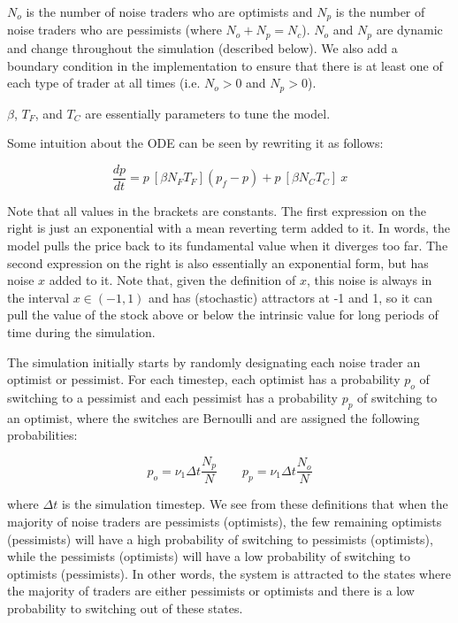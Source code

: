 \documentclass[11pt]{article}
\begin{document}
\noindent $N_o$ is the number of noise traders who are optimists and $N_p$ is the number of noise traders who are pessimists (where $N_o + N_p = N_c$). $N_o$ and $N_p$ are dynamic and change throughout the simulation (described below). We also add a boundary condition in the implementation to ensure that there is at least one of each type of trader at all times (i.e. $N_o > 0$ and $N_p > 0$).



\noindent $\beta$, $T_F$, and $T_C$ are essentially parameters to tune the model.

Some intuition about the ODE can be seen by rewriting it as follows:

\begin{equation}
\frac{dp}{dt} = p \ [\beta N_F T_F] (p_f - p) + p \ [\beta N_C T_C] \ x
\end{equation}

\noindent Note that all values in the brackets are constants. The first expression on the right is just an exponential with a mean reverting term added to it. In words, the model pulls the price back to its fundamental value when it diverges too far. The second expression on the right is also essentially an exponential form, but has noise $x$ added to it. Note that, given the definition of $x$, this noise is always in the interval $x \in (-1, 1)$ and has (stochastic) attractors at -1 and 1, so it can pull the value of the stock above or below the intrinsic value for long periods of time during the simulation.

The simulation initially starts by randomly designating each noise trader an optimist or pessimist. For each timestep, each optimist has a probability $p_o$ of switching to a pessimist and each pessimist has a probability $p_p$ of switching to an optimist, where the switches are Bernoulli and are assigned the following probabilities:

\begin{equation}
p_o = \nu_1 \Delta t \frac{N_p}{N} \qquad p_p = \nu_1 \Delta t \frac{N_o}{N}
\end{equation}

\noindent where $\Delta t$ is the simulation timestep. We see from these definitions that when the majority of noise traders are pessimists (optimists), the few remaining optimists (pessimists) will have a high probability of switching to pessimists (optimists), while the pessimists (optimists) will have a low probability of switching to optimists (pessimists). In other words, the system is attracted to the states where the majority of traders are either pessimists or optimists and there is a low probability to switching out of these states.
\end{document}
